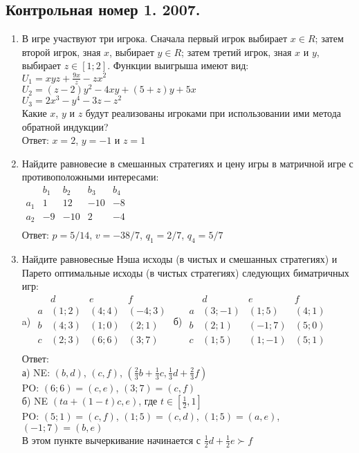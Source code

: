 \documentclass[pdftex,12pt,a4paper]{article}
\begin{document}
\subsection{Контрольная номер 1. 2007.} 
\begin{enumerate}
\item В игре участвуют три игрока. Сначала первый игрок выбирает $x\in R$; затем второй игрок, зная $x$, выбирает $y\in R$; затем третий игрок, зная $x$ и $y$, выбирает $z\in \left[1;2\right]$. Функции выигрыша имеют вид: \\
$U_{1} =xyz+\frac{9x}{z} -zx^{2}$ \\
$U_{2} =\left(z-2\right)y^{2} -4xy+\left(5+z\right)y+5x$\\
$U_{3} =2x^{3} -y^{4} -3z-z^{2}$  \\
Какие $x$, $y$ и $z$ будут реализованы игроками при использовании ими метода обратной индукции? \\
Ответ: $x=2$, $y=-1$ и $z=1$ 

\item Найдите равновесие в смешанных стратегиях и цену игры в матричной игре с противоположными интересами: \\
$
\begin{array}{c|cccc}
& b_1 & b_2 & b_3 & b_4 \\
\hline
a_1 & 1 & 12 & -10 & -8 \\
a_2 & -9 & -10 & 2 & -4 \\
\end{array}
$ \\
Ответ: $p=5/14$, $v=-38/7$, $q_{1}=2/7$, $q_{4}=5/7$ 

\item Найдите равновесные Нэша исходы (в чистых и смешанных стратегиях) и Парето оптимальные исходы (в чистых стратегиях) следующих биматричных игр:\\
a) 
$\begin{array}{c|ccc} 
& d & e & f\\
\hline
a & (1;2) & (4;4) & (-4;3) \\
b & (4;3) & (1;0) & (2;1) \\
c & (2;3) & (6;6) & (3;7) \\
\end{array}$ 
б) 
$\begin{array}{c|ccc} 
& d & e & f\\
\hline
a & (3;-1) & (1;5) & (4;1) \\
b & (2;1) & (-1;7) & (5;0) \\
c & (1;5) & (1;-1) & (5;1) \\
\end{array}$ \\
Ответ: \\
а) NE: $(b,d)$, $(c,f)$, $(\frac{2}{3}b+\frac{1}{3}c,\frac{1}{3}d+\frac{2}{3}f)$ \\
PO: $(6;6)=(c,e)$, $(3;7)=(c,f)$ \\
б) NE $(ta+(1-t)c,e)$, где $t\in[\frac{1}{2},1]$ \\
PO: $(5;1)=(c,f)$, $(1;5)=(c,d)$, $(1;5)=(a,e)$, $(-1;7)=(b,e)$ \\
В этом пункте вычеркивание начинается с $\frac{1}{2}d+\frac{1}{2}e\succ f$ 


\end{enumerate}
\end{document}
